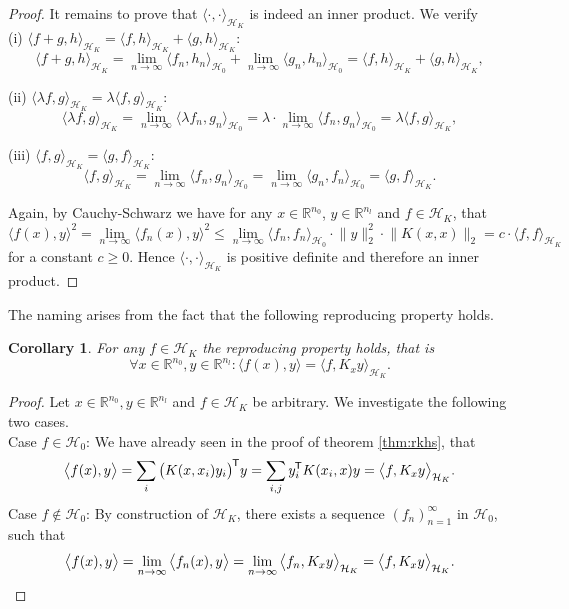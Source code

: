 \documentclass[11pt, a4paper]{article}
\newtheorem{corollary}[theorem]{Corollary}
\newcommand{\R}{\mathbb{R}}
\renewcommand{\H}{\mathcal{H}}
\newcommand*{\tr}{^{\mkern-1.5mu\mathsf{T}}}
\begin{document}
\begin{proof}
It remains to prove that $\langle \cdot, \cdot \rangle_{\H_K}$ is indeed an inner product. We verify \\

(i) $\langle f + g , h \rangle_{\H_K} = \langle f , h \rangle_{\H_K} + \langle g , h \rangle_{\H_K}$:
\[ \langle f + g , h \rangle_{\H_K} = \lim_{n \to \infty} \langle f_n , h_n \rangle_{\H_0} + \lim_{n \to \infty} \langle g_n , h_n \rangle_{\H_0} = \langle f , h \rangle_{\H_K} + \langle g , h \rangle_{\H_K}, \]

(ii) $\langle \lambda f , g \rangle_{\H_K} = \lambda \langle f, g \rangle_{\H_K}$:
\[ \langle \lambda f , g \rangle_{\H_K} = \lim_{n \to \infty} \langle \lambda f_n, g_n \rangle_{\H_0} = \lambda \cdot \lim_{n \to \infty} \langle f_n, g_n \rangle_{\H_0} = \lambda \langle f, g \rangle_{\H_K},  \]

(iii) $\langle f , g \rangle_{\H_K} = \langle g , f \rangle_{\H_K}$:
\[ \langle f , g \rangle_{\H_K} = \lim_{n \to \infty} \langle f_n, g_n \rangle_{\H_0} = \lim_{n \to \infty} \langle g_n, f_n \rangle_{\H_0} = \langle g , f \rangle_{\H_K}. \]

Again, by Cauchy-Schwarz we have for any $x \in \R^{n_0}$, $y \in \R^{n_l}$ and $f \in \H_K$, that
\[ \big \langle f(x), y \big \rangle^2 = \lim_{n \to \infty}  \big \langle f_n(x), y \big \rangle^2 \leq \lim_{n \to \infty} \big \langle f_n , f_n \big \rangle_{\H_0} \cdot \big \| y \big \|_2^2 \cdot \big \| K(x,x) \big \|_2 = c \cdot \big \langle f , f \big \rangle_{\H_K} \]
for a constant $c \geq 0$. Hence $\langle \cdot, \cdot \rangle_{\H_K}$ is positive definite and therefore an inner product.
\end{proof}

The naming arises from the fact that the following reproducing property holds.

\begin{corollary}
For any $f \in \H_K$ the reproducing property holds, that is
\[ \forall x \in \R^{n_0}, y \in \R^{n_l} : \big \langle f(x), y \big \rangle = \big \langle f, K_xy \big \rangle_{\H_K}. \]
\end{corollary}

\begin{proof}
Let $x \in \R^{n_0}, y \in \R^{n_l}$ and $f \in \H_K$ be arbitrary. We investigate the following two cases. \\

Case $f \in \H_0$: We have already seen in the proof of theorem \ref{thm:rkhs}, that
\[ \big \langle f(x), y \big \rangle = \sum_{i} \big ( K(x,x_i)y_i \big ) \tr y = \sum_{i,j} y_i \tr K(x_i,x)y = \big \langle f, K_xy \big \rangle_{\H_K}. \]
Case $f \notin \H_0$: By construction of $\H_K$, there exists a sequence $(f_n)_{n=1}^{\infty}$ in $\H_0$, such that
\[ \big \langle f(x),y \big \rangle = \lim_{n \to \infty} \big \langle f_n(x),y \big \rangle = \lim_{n \to \infty} \big \langle f_n, K_xy \big \rangle_{\H_K} = \big \langle f, K_xy \big \rangle_{\H_K}. \qedhere \]
\end{proof}
\end{document}
